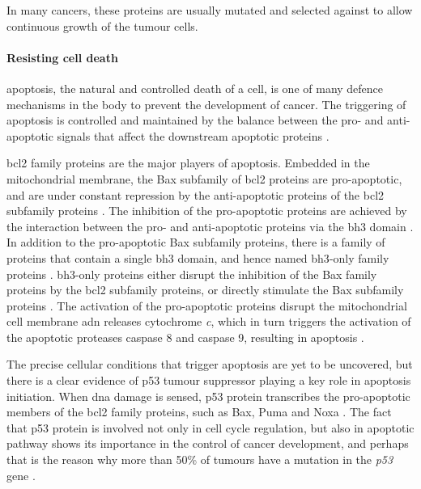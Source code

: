 In many cancers, these proteins are usually mutated and selected against to allow continuous growth of the tumour cells.

\paragraph{Resisting cell death}

\noindent
\Gls{apoptosis}, the natural and controlled death of a cell, is one of many defence mechanisms in the body to prevent the development of cancer.
The triggering of \gls{apoptosis} is controlled and maintained by the balance between the pro- and anti-apoptotic signals that affect the downstream apoptotic proteins \citep{Hanahan2011}.

\Gls{bcl2} family proteins are the major players of apoptosis.
Embedded in the mitochondrial membrane, the Bax subfamily of \gls{bcl2} proteins are pro-apoptotic, and are under constant repression by the anti-apoptotic proteins of the \gls{bcl2} subfamily proteins \citep{Adams2007,Hanahan2011}.
The inhibition of the pro-apoptotic proteins are achieved by the interaction between the pro- and anti-apoptotic proteins via the \gls{bh3} domain \citep{Adams2007}.
In addition to the pro-apoptotic Bax subfamily proteins, there is a family of proteins that contain a single \gls{bh3} domain, and hence named \gls{bh3}-only family proteins \citep{Adams2007}.
\gls{bh3}-only proteins either disrupt the inhibition of the Bax family proteins by the \gls{bcl2} subfamily proteins, or directly stimulate the Bax subfamily proteins \citep{Adams2007}.
The activation of the pro-apoptotic proteins disrupt the mitochondrial cell membrane adn releases cytochrome \textit{c}, which in turn triggers the activation of the apoptotic proteases caspase 8 and caspase 9, resulting in apoptosis \citep{Adams2007,Hanahan2011}.

The precise cellular conditions that trigger apoptosis are yet to be uncovered, but there is a clear evidence of p53 tumour suppressor playing a key role in apoptosis initiation.
When \acrshort{dna} damage is sensed, p53 protein transcribes the pro-apoptotic members of the \gls{bcl2} family proteins, such as Bax, Puma and Noxa \citep{Fridman2003,Hanahan2011}.
The fact that p53 protein is involved not only in cell cycle regulation, but also in apoptotic pathway shows its importance in the control of cancer development, and perhaps that is the reason why more than 50\% of tumours have a mutation in the \textit{p53} gene \citep{Levine1997}.

